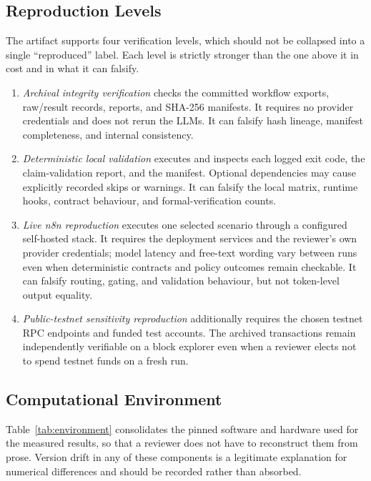 \documentclass[journal]{IEEEtran}
\newcommand{\artifactpath}[1]{\path{#1}}
\begin{document}
\subsection{Reproduction Levels}
The artifact supports four verification levels, which should not be collapsed
into a single ``reproduced'' label. Each level is strictly stronger than the
one above it in cost and in what it can falsify.

\begin{enumerate}
\item \emph{Archival integrity verification} checks the committed workflow
exports, raw/result records, reports, and SHA-256 manifests. It requires no
provider credentials and does not rerun the LLMs. It can falsify hash lineage,
manifest completeness, and internal consistency.
\item \emph{Deterministic local validation} executes
\artifactpath{scripts/reproduce_paper_258.sh} and inspects each logged exit
code, the claim-validation report, and the manifest. Optional dependencies may
cause explicitly recorded skips or warnings. It can falsify the local matrix,
runtime hooks, contract behaviour, and formal-verification counts.
\item \emph{Live n8n reproduction} executes one selected scenario through a
configured self-hosted stack. It requires the deployment services and the
reviewer's own provider credentials; model latency and free-text wording vary
between runs even when deterministic contracts and policy outcomes remain
checkable. It can falsify routing, gating, and validation behaviour, but not
token-level output equality.
\item \emph{Public-testnet sensitivity reproduction} additionally requires the
chosen testnet RPC endpoints and funded test accounts. The archived
transactions remain independently verifiable on a block explorer even when a
reviewer elects not to spend testnet funds on a fresh run.
\end{enumerate}

\subsection{Computational Environment}
Table~\ref{tab:environment} consolidates the pinned software and hardware used
for the measured results, so that a reviewer does not have to reconstruct them
from prose. Version drift in any of these components is a legitimate
explanation for numerical differences and should be recorded rather than
absorbed.
\end{document}
